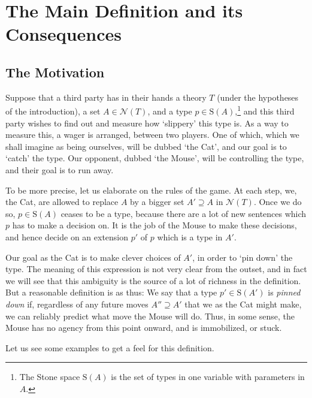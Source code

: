 \documentclass{article}
\theoremstyle{nonumberplain}
\newcommand{\calN}{\mathcal{N}}
\newcommand{\Stone}{\mathrm{S}}
\begin{document}
\section{The Main Definition and its Consequences}

\subsection{The Motivation}

Suppose that a third party has in their hands a theory $T$ (under the hypotheses of the introduction), a set $A \in \calN(T)$, and a type $p \in \Stone(A)$,\footnote{The Stone space $\Stone(A)$ is the set of types in one variable with parameters in $A$.} and this third party wishes to find out and measure how `slippery' this type is. As a way to measure this, a wager is arranged, between two players. One of which, which we shall imagine as being ourselves, will be dubbed `the Cat', and our goal is to `catch' the type. Our opponent, dubbed `the Mouse', will be controlling the type, and their goal is to run away.

To be more precise, let us elaborate on the rules of the game. At each step, we, the Cat, are allowed to replace $A$ by a bigger set $A' \supseteq A$ in $\calN(T)$. Once we do so, $p \in \Stone(A)$ ceases to be a type, because there are a lot of new sentences which $p$ has to make a decision on. It is the job of the Mouse to make these decisions, and hence decide on an extension $p'$ of $p$ which is a type in $A'$.

Our goal as the Cat is to make clever choices of $A'$, in order to `pin down' the type. The meaning of this expression is not very clear from the outset, and in fact we will see that this ambiguity is the source of a lot of richness in the definition. But a reasonable definition is as thus: We say that a type $p' \in \Stone(A')$ is \emph{pinned down} if, regardless of any future moves $A'' \supseteq A'$ that we as the Cat might make, we can reliably predict what move the Mouse will do. Thus, in some sense, the Mouse has no agency from this point onward, and is immobilized, or stuck.

Let us see some examples to get a feel for this definition.
\end{document}
